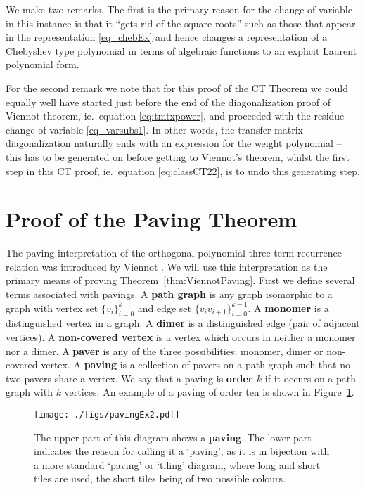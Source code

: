\documentclass[11pt,a4paper]{article}
\newcommand{\defin}[1]{\textbf{#1}}		%
\begin{document}
We make two remarks. The first is the primary reason for the change of variable in this instance is that it ``gets rid of the square roots'' such as those that appear in the representation \eqref{eq_chebEx} and hence changes a representation of a             Chebyshev type polynomial in terms of algebraic functions to an explicit  Laurent polynomial form.


For the second remark we note that for this proof of the CT Theorem we could equally well have started just before  the end of the diagonalization proof of Viennot theorem, ie.\ equation \eqref{eq:tmtxpower}, and proceeded with the residue change of variable \eqref{eq_varsubs1}. In other words, the transfer matrix diagonalization naturally ends with an expression for the weight polynomial -- this has to be generated on before getting to Viennot's theorem,  whilst the first step in this CT proof, ie.\ equation \eqref{eq:classCT22},  is to undo this generating step.





%
\section{Proof of the Paving Theorem}	%
%

The paving interpretation of the orthogonal polynomial three term recurrence relation was introduced by Viennot \cite{Viennot1985ah}. We will use this interpretation as the primary means  of proving Theorem~\ref{thm:ViennotPaving}. First we define several terms associated with pavings.  A \defin{path graph} is any graph isomorphic to a graph with vertex set $\{v_i\}_{i=0}^k$ and edge set $\{v_iv_{i+1}\}_{i=0}^{k-1}$.  
A \defin{monomer} is a distinguished vertex in a graph.  A \defin{dimer} is a distinguished edge (pair of adjacent vertices).  A \defin{non-covered vertex} is a vertex which occurs in neither a monomer nor a dimer.  A \defin{paver} is any of the three possibilities:  monomer, dimer or non-covered vertex.  A \defin{paving} is a collection of pavers on a path graph such that no two pavers share a vertex.  
We say that a paving is \defin{order $k$} if it occurs on a path graph  with $k$ vertices.
An example of a paving of order ten is shown in Figure~\ref{fig:pavingEx2}.  
\begin{figure}[htbp]
	\begin{center}
	\texttt{[image: ./figs/pavingEx2.pdf]}
	\end{center}
	\caption{The upper part of this diagram shows a \defin{paving}.  The lower part indicates the reason for calling it a `paving', as it is in bijection with a more standard `paving' or `tiling' diagram, where long and short tiles are used, the short tiles being of two possible colours.}
	\label{fig:pavingEx2}

\end{figure}
\end{document}
